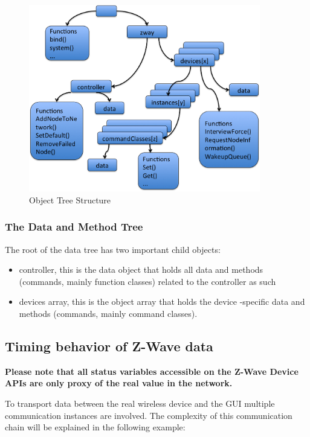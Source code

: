 \begin{figure}
\begin{center}
\includegraphics[width=0.9\textwidth]{pngs/cap11/zwayblocks.png}
\caption{\zway Object Tree Structure}
\label{zwaystructure}
\end{center}
\end{figure}

\subsubsection {The Data and Method Tree}

The root of the data tree has two important child objects:
\begin{itemize}
\item controller, this is the data object that holds all data and methods 
(commands, mainly function classes) related to the \zway controller as such 
\item devices array, this is the object array that holds the device -specific 
data and methods (commands, mainly command classes).
\end {itemize}


\subsection{Timing behavior of Z-Wave data}

\textbf{Please note that all status variables accessible on the Z-Wave Device APIs
are only proxy of the real value in the network.}

To transport data between the real wireless device and the GUI multiple 
communication instances are involved. The complexity of this communication 
chain will be explained in the following example:

